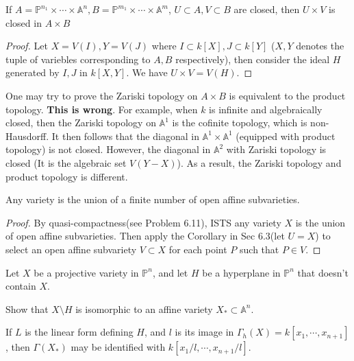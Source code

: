 \documentclass{solution}
\begin{document}
\begin{lemma}
    If $A = \mathbb{P}^{n_1} \times \cdots \times \mathbb{A}^n, B = \mathbb{P}^{m_1} \times \cdots \times \mathbb{A}^m$, $U \subset A, V \subset B$ are closed, then $U \times V$ is closed in $A \times B$
\end{lemma}

\begin{proof}
    Let $X = V(I), Y = V(J)$ where $I \subset k[X], J \subset k[Y]$ ($X, Y$ denotes the tuple of variebles corresponding to $A, B$ respectively), then consider the ideal $H$ generated by $I, J$ in $k[X, Y]$. We have $U \times V = V(H)$.
\end{proof}

One may try to prove the Zariski topology on $A \times B$ is equivalent to the product topology. \textbf{This is wrong}. For example, when $k$ is infinite and algebraically closed, then the Zariski topology on $\mathbb{A}^1$ is the cofinite topology, which is non-Hausdorff. It then follows that the diagonal in $\mathbb{A}^1 \times \mathbb{A}^1$ (equipped with product topology) is not closed. However, the diagonal in $\mathbb{A}^2$ with Zariski topology is closed (It is the algebraic set $V(Y - X)$). As a result, the Zariski topology and product topology is different.

\begin{problem}{6.21}
    Any variety is the union of a finite number of open affine subvarieties.
\end{problem}

\begin{proof}
    By quasi-compactness(see Problem 6.11), ISTS any variety $X$ is the union of open affine subvarieties. Then apply the Corollary in Sec 6.3(let $U = X$) to select an open affine subvariety $V \subset X$ for each point $P$ such that $P \in V$.
\end{proof}

\begin{problem}{6.22}
    Let $X$ be a projective variety in $\mathbb{P}^n$, and let $H$ be a hyperplane in $\mathbb{P}^n$ that doesn't contain $X$. \begin{inparaenum}
        \item Show that $X \setminus H$ is isomorphic to an affine variety $X_* \subset \mathbb{A}^n$.
        \item If $L$ is the linear form defining $H$, and $l$ is its image in $\Gamma_h(X) = k[x_1, \cdots, x_{n + 1}]$, then $\Gamma(X_*)$ may be identified with $k[x_1 / l, \cdots, x_{n + 1} / l]$.
    \end{inparaenum}
\end{problem}
\end{document}
